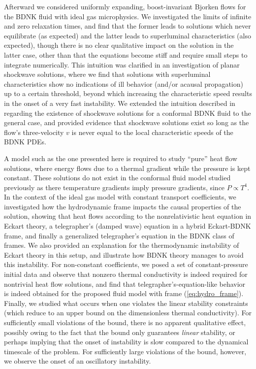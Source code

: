 \documentclass[%
notitlepage,
superscriptaddress,
nofootinbib,
amsmath,
amssymb,
aps,
twocolumn
]{revtex4-1}
\begin{document}
Afterward we considered uniformly expanding, boost-invariant Bjorken flows for the BDNK fluid with ideal gas microphysics.  We investigated the limits of infinite and zero relaxation times, and find that the former leads to solutions which never equilibrate (as expected) and the latter leads to superluminal characteristics (also expected), though there is no clear qualitative impact on the solution in the latter case, other than that the equations become stiff and require small steps to integrate numerically.  This intuition was clarified in an investigation of planar shockwave solutions, where we find that solutions with superluminal characteristics show no indications of ill behavior (and/or acausal propagation) up to a certain threshold, beyond which increasing the characteristic speed results in the onset of a very fast instability.  We extended the intuition described in \cite{Pandya_2021,Freistuhler2021} regarding the existence of shockwave solutions for a conformal BDNK fluid to the general case, and provided evidence that shockwave solutions exist so long as the flow's three-velocity $v$ is never equal to the local characteristic speeds of the BDNK PDEs.

A model such as the one presented here is required to study ``pure'' heat flow solutions, where energy flows due to a thermal gradient while the pressure is kept constant.  These solutions do not exist in the conformal fluid model studied previously \cite{Pandya_2021,Pandya:2022pif} as there temperature gradients imply pressure gradients, since $P \propto T^{4}$.  In the context of the ideal gas model with constant transport coefficients, we investigated how the hydrodynamic frame impacts the causal properties of the solution, showing that heat flows according to the nonrelativistic heat equation in Eckart theory, a telegrapher's (damped wave) equation in a hybrid Eckart-BDNK frame, and finally a generalized telegrapher's equation in the BDNK class of frames.  We also provided an explanation for the thermodynamic instability of Eckart theory in this setup, and illustrate how BDNK theory manages to avoid this instability.  For non-constant coefficients, we posed a set of constant-pressure initial data and observe that nonzero thermal conductivity is indeed required for nontrivial heat flow solutions, and find that telegrapher's-equation-like behavior is indeed obtained for the proposed fluid model with frame (\ref{eq:hydro_frame}).  Finally, we studied what occurs when one violates the linear stability constraints (which reduce to an upper bound on the dimensionless thermal conductivity). For sufficiently small violations of the bound, there is no apparent qualitative effect, possibly owing to the fact that the bound only guarantees \textit{linear} stability, or perhaps implying that the onset of instability is slow compared to the dynamical timescale of the problem.  For sufficiently large violations of the bound, however, we observe the onset of an oscillatory instability.
\end{document}

